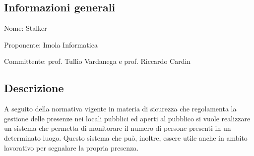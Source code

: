 \documentclass[../studio-di-fattibilita.tex]{subfiles}
\begin{document}
\subsection{Informazioni generali}%
\label{sub:informazioni_generale}
\begin{description}
  \item Nome: Stalker
  \item Proponente: Imola Informatica
  \item Committente: prof. Tullio Vardanega e prof. Riccardo Cardin
\end{description}

\subsection{Descrizione}%
\label{descrizione}
A seguito della normativa vigente in materia di sicurezza che regolamenta la gestione delle presenze nei locali pubblici ed aperti al pubblico si vuole realizzare un sistema che permetta di monitorare il numero di persone presenti in un determinato luogo. Questo sistema che può, inoltre, essere utile anche in ambito lavorativo per segnalare la propria presenza.
\end{document}

